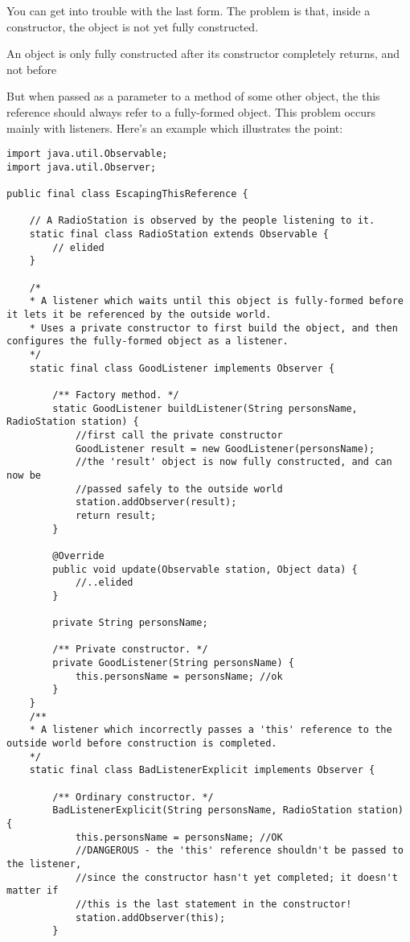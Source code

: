 You can get into trouble with the last form. The problem is that, inside a constructor, the object is not yet fully constructed.

\begin{remark}
    An object is only fully constructed after its constructor completely returns, and not before
\end{remark}

But when passed as a parameter to a method of some other object, the this reference should always refer to a fully-formed object. This problem occurs mainly with listeners. Here's an example which illustrates the point:

\begin{verbatim}
import java.util.Observable;
import java.util.Observer;

public final class EscapingThisReference {

    // A RadioStation is observed by the people listening to it.
    static final class RadioStation extends Observable {
        // elided
    }

    /*
    * A listener which waits until this object is fully-formed before it lets it be referenced by the outside world.
    * Uses a private constructor to first build the object, and then configures the fully-formed object as a listener.
    */
    static final class GoodListener implements Observer {

        /** Factory method. */
        static GoodListener buildListener(String personsName, RadioStation station) {
            //first call the private constructor
            GoodListener result = new GoodListener(personsName);
            //the 'result' object is now fully constructed, and can now be
            //passed safely to the outside world
            station.addObserver(result);
            return result;
        }

        @Override
        public void update(Observable station, Object data) {
            //..elided
        }

        private String personsName;

        /** Private constructor. */
        private GoodListener(String personsName) {
            this.personsName = personsName; //ok
        }
    }
    /**
    * A listener which incorrectly passes a 'this' reference to the outside world before construction is completed.
    */
    static final class BadListenerExplicit implements Observer {

        /** Ordinary constructor. */
        BadListenerExplicit(String personsName, RadioStation station) {
            this.personsName = personsName; //OK
            //DANGEROUS - the 'this' reference shouldn't be passed to the listener,
            //since the constructor hasn't yet completed; it doesn't matter if
            //this is the last statement in the constructor!
            station.addObserver(this);
        }


\end{verbatim}
